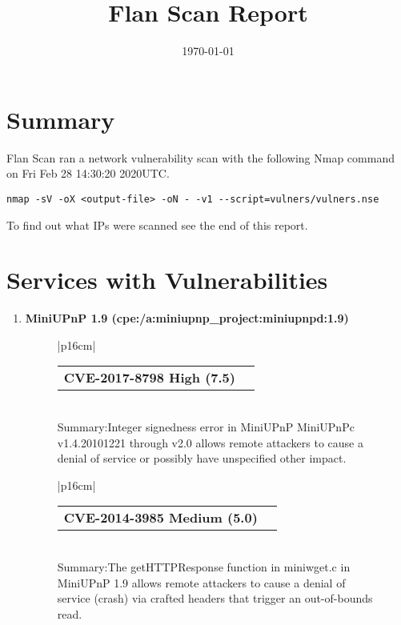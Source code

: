 \documentclass{article}
\title{Flan Scan Report\\}
\date{\today}
\begin{document}
\maketitle

\section*{Summary}
Flan Scan ran a network vulnerability scan with the following Nmap command on Fri Feb 28 14:30:20 2020UTC.
\begin{lstlisting}
nmap -sV -oX <output-file> -oN - -v1 --script=vulners/vulners.nse
\end{lstlisting}
To find out what IPs were scanned see the end of this report.
\section*{Services with Vulnerabilities}\begin{enumerate}[wide, labelwidth=!, labelindent=0pt,
                        label=\textbf{\large \arabic{enumi} \large}]
\item \textbf{\large MiniUPnP 1.9 (cpe:/a:miniupnp_project:miniupnpd:1.9)  \large}\begin{figure}[h!]
\begin{tabular}{|p{16cm}|} \begin{tabular}{@{}p{15cm}>{\raggedleft\arraybackslash}
                           p{0.5cm}@{}}\textbf{CVE-2017-8798 High (7.5)} & \href{https://nvd.nist.gov/vuln/detail/CVE-2017-8798}{\large \faicon{link}}\end{tabular}\\
 Summary:Integer signedness error in MiniUPnP MiniUPnPc v1.4.20101221 through v2.0 allows remote attackers to cause a denial of service or possibly have unspecified other impact.\\ \hline \end{tabular}  \end{figure}
\begin{figure}[h!]
\begin{tabular}{|p{16cm}|} \begin{tabular}{@{}p{15cm}>{\raggedleft\arraybackslash}
                           p{0.5cm}@{}}\textbf{CVE-2014-3985 Medium (5.0)} & \href{https://nvd.nist.gov/vuln/detail/CVE-2014-3985}{\large \faicon{link}}\end{tabular}\\
 Summary:The getHTTPResponse function in miniwget.c in MiniUPnP 1.9 allows remote attackers to cause a denial of service (crash) via crafted headers that trigger an out-of-bounds read.\\ \hline \end{tabular}  \end{figure}

\end{enumerate}
\end{document}
